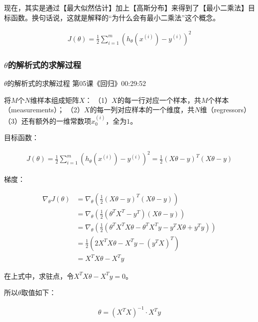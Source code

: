 \documentclass[UTF8]{ctexart}
\begin{document}
现在，其实是通过【最大似然估计】加上【高斯分布】来得到了【最小二乘法】目标函数。换句话说，这就是解释的“为什么会有最小二乘法”这个概念。

\begin{equation}
\begin{aligned}
J(\theta)=\frac{1}{2} \sum_{i=1}^{m}(h_{\theta}(x^{(i)}) - y^{(i)})^{2}
\end{aligned}
\end{equation}

\subsubsection{$\theta$的解析式的求解过程}

$\theta$的解析式的求解过程 第05课《回归》00:29:52

将$M$个$N$维样本组成矩阵$X$：
（1）$X$的每一行对应一个样本，共$M$个样本（measurements）；
（2）$X$的每一列对应样本的一个维度，共$N$维（regressors）
（3）还有额外的一维常数项$x^{(i)}_{0}$，全为$1$。

目标函数：

\begin{equation}
\begin{aligned}
J(\theta)=\frac{1}{2} \sum_{i=1}^{m}(h_{\theta}(x^{(i)}) - y^{(i)})^{2}=\frac{1}{2} (X\theta-y)^{T}(X\theta-y)
\end{aligned}
\end{equation}

梯度：

\begin{equation}
\begin{aligned}
\nabla_{\theta}J(\theta)&=\nabla_{\theta}(\frac{1}{2}(X\theta-y)^{T}(X\theta-y))\\
&=\nabla_{\theta}(\frac{1}{2}(\theta^{T}X^{T}-y^{T})(X\theta-y))\\
&=\nabla_{\theta}(\frac{1}{2}(\theta^{T}X^{T}X\theta-\theta^{T}X^{T}y-y^{T}X\theta+y^{T}y))\\
&=\frac{1}{2}(2X^{T}X\theta-X^{T}y-(y^{T}X)^{T})\\
&=X^{T}X\theta-X^{T}y
\end{aligned}
\end{equation}

在上式中，求驻点，令$X^{T}X\theta-X^{T}y=0$。

所以$\theta$取值如下：

\begin{equation}
\begin{aligned}
\theta=(X^{T}X)^{-1}\cdot X^{T}y
\end{aligned}
\end{equation}
\end{document}
